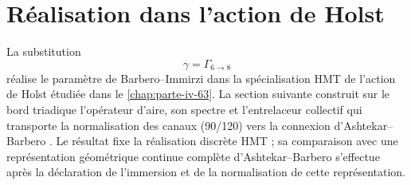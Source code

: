 \section{Réalisation dans l’action de Holst}

La substitution
\[
 \gamma=\Gamma_{6\to8}
\]
réalise le paramètre de Barbero--Immirzi dans la spécialisation HMT de
l’action de Holst étudiée dans le \cref{chap:parte-iv-63}. La section suivante
construit sur le bord triadique l’opérateur d’aire, son spectre et
l’entrelaceur collectif qui transporte la normalisation des canaux
(90/120) vers la connexion d’Ashtekar--Barbero
\cite{Barbero1995,Immirzi1997,Holst1996}. Le résultat fixe la réalisation
discrète HMT ; sa comparaison avec une représentation géométrique continue
complète d’Ashtekar--Barbero s’effectue après la déclaration de l’immersion et
de la normalisation de cette représentation.
